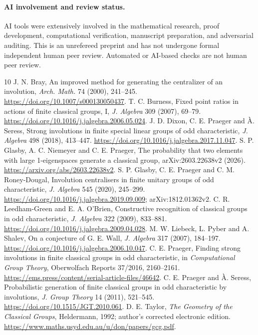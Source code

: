 \documentclass[11pt]{article}
\begin{document}
\paragraph{AI involvement and review status.}
AI tools were extensively involved in the mathematical research, proof development, computational verification, manuscript preparation, and adversarial auditing. This is an unrefereed preprint and has not undergone formal independent human peer review. Automated or AI-based checks are not human peer review.

\begingroup\small
\begin{thebibliography}{10}
 J. N. Bray, An improved method for generating the centralizer of an involution, \emph{Arch. Math.} 74 (2000), 241--245. \url{https://doi.org/10.1007/s000130050437}.
 T. C. Burness, Fixed point ratios in actions of finite classical groups, I, \emph{J. Algebra} 309 (2007), 69--79. \url{https://doi.org/10.1016/j.jalgebra.2006.05.024}.
 J. D. Dixon, C. E. Praeger and \`A. Seress, Strong involutions in finite special linear groups of odd characteristic, \emph{J. Algebra} 498 (2018), 413--447. \url{https://doi.org/10.1016/j.jalgebra.2017.11.047}.
 S. P. Glasby, A. C. Niemeyer and C. E. Praeger, The probability that two elements with large 1-eigenspaces generate a classical group, arXiv:2603.22638v2 (2026). \url{https://arxiv.org/abs/2603.22638v2}.
 S. P. Glasby, C. E. Praeger and C. M. Roney-Dougal, Involution centralisers in finite unitary groups of odd characteristic, \emph{J. Algebra} 545 (2020), 245--299. \url{https://doi.org/10.1016/j.jalgebra.2019.09.009}; arXiv:1812.01362v2.
 C. R. Leedham-Green and E. A. O'Brien, Constructive recognition of classical groups in odd characteristic, \emph{J. Algebra} 322 (2009), 833--881. \url{https://doi.org/10.1016/j.jalgebra.2009.04.028}.
 M. W. Liebeck, L. Pyber and A. Shalev, On a conjecture of G. E. Wall, \emph{J. Algebra} 317 (2007), 184--197. \url{https://doi.org/10.1016/j.jalgebra.2006.10.047}.
 C. E. Praeger, Finding strong involutions in finite classical groups in odd characteristic, in \emph{Computational Group Theory}, Oberwolfach Reports 37/2016, 2160--2161. \url{https://ems.press/content/serial-article-files/46642}.
 C. E. Praeger and \`A. Seress, Probabilistic generation of finite classical groups in odd characteristic by involutions, \emph{J. Group Theory} 14 (2011), 521--545. \url{https://doi.org/10.1515/JGT.2010.061}.
 D. E. Taylor, \emph{The Geometry of the Classical Groups}, Heldermann, 1992; author's corrected electronic edition. \url{https://www.maths.usyd.edu.au/u/don/papers/gcg.pdf}.
\end{thebibliography}
\endgroup
\end{document}
